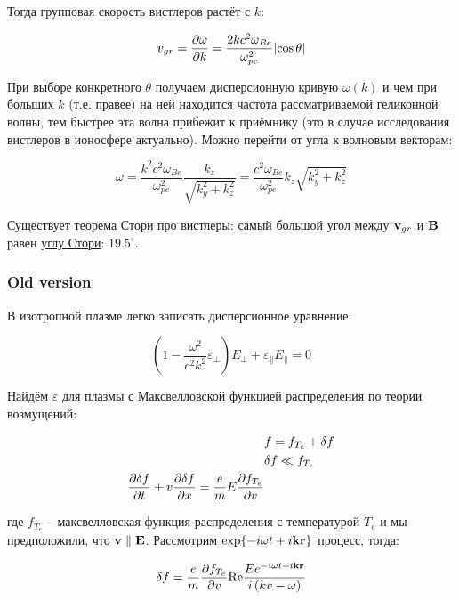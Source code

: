 \documentclass[10pt, a4paper]{article}
\begin{document}
Тогда групповая скорость вистлеров растёт с $k$:

\begin{equation*}
	v_{gr} = \pdv{\omega}{k} = \frac{2kc^2\omega_{Be}}{\omega_{pe}^2}\abs{\cos\theta}
\end{equation*}

При выборе конкретного $\theta$ получаем дисперсионную кривую $\omega(k)$ и чем при больших $k$ (т.е. правее) на ней находится частота рассматриваемой геликонной волны, тем быстрее эта волна прибежит к приёмнику (это в случае исследования вистлеров в ионосфере актуально). Можно перейти от угла к волновым векторам: 

\begin{equation*}
	\omega = \frac{k^2c^2\omega_{Be}}{\omega_{pe}^2} \frac{k_z}{\sqrt{k_y^2+k_z^2}} = \frac{c^2\omega_{Be}}{\omega_{pe}^2}k_z\sqrt{k_y^2+k_z^2}
\end{equation*}

Существует теорема Стори про вистлеры: самый большой угол между $\vb{v}_{gr}$ и $\vb{B}$ равен \uline{углу Стори}: $19.5^\circ$.

\subsubsection{Old version}

В изотропной плазме легко записать дисперсионное уравнение:

\begin{equation}
    \left(1-\frac{\omega^2}{c^2 k^2} \varepsilon_{\perp}\right) E_{\perp} + \varepsilon_{\parallel} E_{\parallel}= 0
\end{equation}

Найдём $\varepsilon$ для плазмы с Максвелловской функцией распределения по теории возмущений:

\begin{align*}
	& f = f_{T_e} + \delta f \\
	& \delta f \ll f_{T_e} \\
	\pdv{\delta f}{t} + v\pdv{\delta f}{x} = \frac{e}{m}E \pdv{f_{T_e}}{v}
\end{align*}

где $f_{T_e}$ -- максвелловская функция распределения с температурой $T_e$ и мы предположили, что $\vb{v} \parallel \vb{E}$. Рассмотрим $\exp{-i\omega t + i \vb{kr}}$ процесс, тогда:

\begin{equation*}
	\delta f = \frac{e}{m}\pdv{f_{T_e}}{v}\text{Re}\frac{Ee^{-i\omega t + i \vb{kr}}}{i\left( kv - \omega \right)}
\end{equation*}
\end{document}
